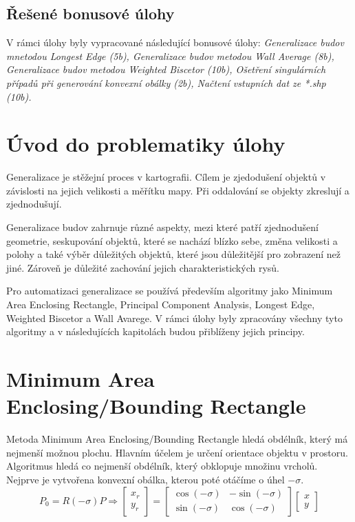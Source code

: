 \documentclass[12pt, a4paper]{article}
\begin{document}
\subsection*{Řešené bonusové úlohy}
V rámci úlohy byly vypracované následující bonusové úlohy: \textit {Generalizace budov mnetodou Longest Edge (5b), Generalizace budov metodou Wall Average (8b), Generalizace budov metodou Weighted Biscetor (10b), Ošetření singulárních případů při generování konvexní obálky (2b), Načtení vstupních dat ze *.shp (10b).}

\newpage
\section{Úvod do problematiky úlohy}
\vspace{5mm}
Generalizace je stěžejní proces v kartografii. Cílem je zjedodušení objektů v závislosti na jejich velikosti a měřítku mapy. Při oddalování se objekty zkreslují a zjednodušují. 
\vspace{3mm}

\noindent Generalizace budov zahrnuje různé aspekty, mezi které patří zjednodušení geometrie, seskupování objektů, které se nachází blízko sebe, změna velikosti a polohy a také výběr důležitých objektů, které jsou důležitější pro zobrazení než jiné. Zároveň je důležité zachování jejich charakteristických rysů.  
\vspace{3mm}

\noindent Pro automatizaci generalizace se používá především algoritmy jako Minimum Area Enclosing Rectangle, Principal Component Analysis, Longest Edge, Weighted Biscetor a Wall Avarege. V rámci úlohy byly zpracovány všechny tyto algoritmy a v následujících kapitolách budou přiblíženy jejich principy. 
\vspace{2cm}


\newpage
\section {Minimum Area Enclosing/Bounding Rectangle}

\vspace{1cm}
Metoda Minimum Area Enclosing/Bounding Rectangle hledá obdélník, který má nejmenší možnou plochu. Hlavním účelem je určení orientace objektu v prostoru. Algoritmus hledá co nejmenší obdélník, který obklopuje množinu vrcholů. Nejprve je vytvořena konvexní obálka, kterou poté otáčíme o úhel $-\sigma$. 
\vspace{1cm}
$$P_0 = R(-\sigma)P \Rightarrow
\begin{bmatrix} x_r \\ y_r \end{bmatrix} =
\begin{bmatrix} \cos(-\sigma) & -\sin(-\sigma) \\ \sin(-\sigma) & \cos(-\sigma) \end{bmatrix}
\begin{bmatrix} x \\ y \end{bmatrix}$$
\vspace{1.5cm}
\end{document}
